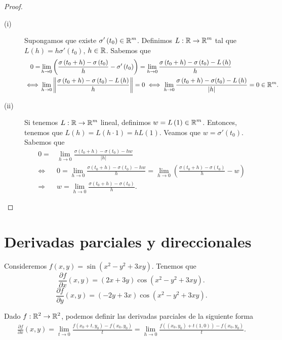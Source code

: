 \begin{proof}
\begin{description}
\item[(i)] Supongamos que existe $\displaystyle \sigma'\left(t_{0}\right) \in \mathbb{R}^{m} $. Definimos $\displaystyle L : \mathbb{R} \to \mathbb{R}^{m} $ tal que $\displaystyle L\left(h\right) = h\sigma'\left(t_{0}\right) $, $\displaystyle h \in \mathbb{R} $. Sabemos que
	\[
	\begin{split}
		0 = & \lim_{h \to 0}\left(\frac{\sigma \left(t_{0}+h\right)-\sigma\left(t_{0}\right)}{h}-\sigma'\left(t_{0}\right)\right) = \lim_{h \to 0}\frac{\sigma\left(t_{0}+h\right)-\sigma\left(t_{0}\right)-L\left(h\right)}{h} \\
	\iff & \lim_{h \to 0}\left\|\frac{\sigma\left(t_{0}+h\right)-\sigma\left(t_{0}\right)-L\left(h\right)}{h}\right\| = 0 \iff \lim_{h \to 0} \frac{\sigma\left(t_{0}+h\right)-\sigma(t_{0}) - L\left(h\right)}{ \left|h\right|} = 0 \in \mathbb{R}^{m}.
	\end{split}
	\]
\item[(ii)] Si tenemos $\displaystyle L : \mathbb{R} \to \mathbb{R}^{m} $ lineal, definimos $\displaystyle w = L\left(1\right) \in \mathbb{R}^{m} $. Entonces, tenemos que $\displaystyle L\left(h\right) = L\left(h \cdot 1\right) = hL\left(1\right) $. Veamos que $\displaystyle w = \sigma'\left(t_{0}\right) $. Sabemos que
	\[
	\begin{split}
		0 = & \lim_{h \to 0}\frac{\sigma\left(t_{0}+h\right)-\sigma\left(t_{0}\right)-hw}{ \left|h\right|} \\
	\iff & 0 = \lim_{h \to 0}\frac{\sigma\left(t_{0}+h\right)-\sigma\left(t_{0}\right)-hw}{h} =\lim_{h \to 0}\left(\frac{\sigma\left(t_{0}+h\right)-\sigma\left(t_{0}\right)}{h}-w\right) \\
	\Rightarrow & w = \lim_{h \to 0}\frac{\sigma\left(t_{0}+h\right)-\sigma\left(t_{0}\right)}{h} .
	\end{split}
	\]
\end{description}
\end{proof}
\section{Derivadas parciales y direccionales}
\begin{eg}
Consideremos $\displaystyle f\left(x,y\right) = \sin\left(x^{2}-y^{2}+3xy\right) $. Tenemos que
\[\frac{\partial f}{\partial x}\left(x,y\right) = \left(2x+3y\right)\cos\left(x^{2}-y^{2}+3xy\right) .\]
\[\frac{\partial f}{\partial y}\left(x,y\right) = \left(-2y + 3x\right)\cos\left(x^{2}-y^{2}+3xy\right) .\]
\end{eg}
Dado $\displaystyle f : \mathbb{R}^{2} \to \mathbb{R}^{2} $, podemos definir las derivadas parciales de la siguiente forma
\[
\begin{split}
\frac{\partial f}{\partial x}\left(x,y\right) = \lim_{t \to 0}\frac{f\left(x_{0}+ t, y_{0}\right)-f\left(x_{0}, y_{0}\right)}{t} = \lim_{h \to 0}\frac{f\left(\left(x_{0},y_{0}\right)+t\left(1,0\right)\right)-f\left(x_{0}, y_{0}\right)}{t} .
\end{split}
\]

